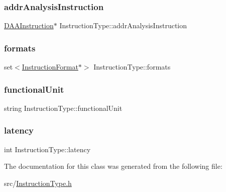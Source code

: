 \subsubsection{\texorpdfstring{addr\+Analysis\+Instruction}{addrAnalysisInstruction}}
{\footnotesize\ttfamily \hyperlink{classDAAInstruction}{D\+A\+A\+Instruction}$\ast$ Instruction\+Type\+::addr\+Analysis\+Instruction\hspace{0.3cm}{\ttfamily [protected]}}

\mbox{\label{classInstructionType_a039493f9dcd605e25bb96ac3f510a501}} 
\subsubsection{\texorpdfstring{formats}{formats}}
{\footnotesize\ttfamily set$<$\hyperlink{classInstructionFormat}{Instruction\+Format}$\ast$$>$ Instruction\+Type\+::formats\hspace{0.3cm}{\ttfamily [protected]}}

\mbox{\label{classInstructionType_a5163498ca8a68d727c6c89cd443a37f8}} 
\subsubsection{\texorpdfstring{functional\+Unit}{functionalUnit}}
{\footnotesize\ttfamily string Instruction\+Type\+::functional\+Unit\hspace{0.3cm}{\ttfamily [protected]}}

\mbox{\label{classInstructionType_a99de20a7ccac1417a3e777ff25dfe3ed}} 
\subsubsection{\texorpdfstring{latency}{latency}}
{\footnotesize\ttfamily int Instruction\+Type\+::latency\hspace{0.3cm}{\ttfamily [protected]}}



The documentation for this class was generated from the following file\+:\begin{DoxyCompactItemize}
\item 
src/\hyperlink{InstructionType_8h}{Instruction\+Type.\+h}\end{DoxyCompactItemize}
